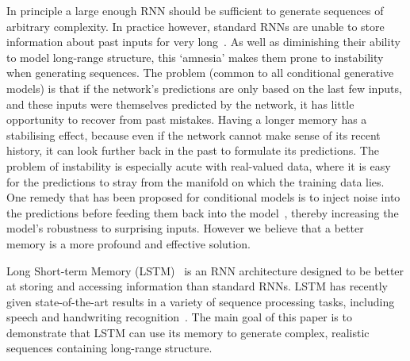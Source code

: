 In principle a large enough RNN should be sufficient to generate sequences of arbitrary complexity. In practice however, standard RNNs are unable to store information about past inputs for very long~\cite{hochreiter01book}. As well as diminishing their ability to model long-range structure, this `amnesia' makes them prone to instability when generating sequences. The problem (common to all conditional generative models) is that if the network's predictions are only based on the last few inputs, and these inputs were themselves predicted by the network, it has little opportunity to recover from past mistakes. Having a longer memory has a stabilising effect, because even if the network cannot make sense of its recent history, it can look further back in the past to formulate its predictions. The problem of instability is especially acute with real-valued data, where it is easy for the predictions to stray from the manifold on which the training data lies. One remedy that has been proposed for conditional models is to inject noise into the predictions before feeding them back into the model~\cite{taylor09gait}, thereby increasing the model's robustness to surprising inputs. However we believe that a better memory is a more profound and effective solution.

Long Short-term Memory (LSTM)~\cite{hochreiter97lstm} is an RNN architecture designed to be better at storing and accessing information than standard RNNs. LSTM has recently given state-of-the-art results in a variety of sequence processing tasks, including speech and handwriting recognition~\cite{graves13icassp,graves09nips}. The main goal of this paper is to demonstrate that LSTM can use its memory to generate complex, realistic sequences containing long-range structure.

